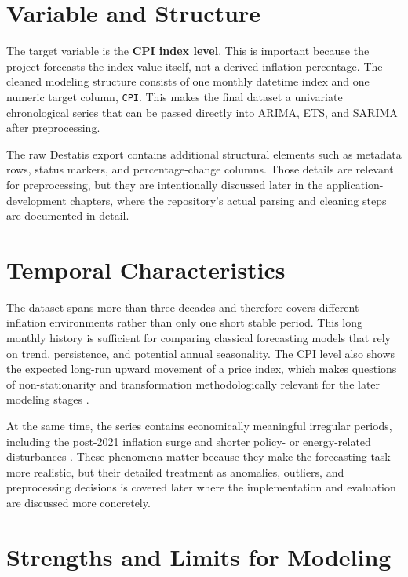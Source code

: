 \section{Variable and Structure}

The target variable is the \textbf{CPI index level}. This is important because the project forecasts the index value itself, not a derived inflation percentage. The cleaned modeling structure consists of one monthly datetime index and one numeric target column, \texttt{CPI}. This makes the final dataset a univariate chronological series that can be passed directly into ARIMA, ETS, and SARIMA after preprocessing.

The raw Destatis export contains additional structural elements such as metadata rows, status markers, and percentage-change columns. Those details are relevant for preprocessing, but they are intentionally discussed later in the application-development chapters, where the repository's actual parsing and cleaning steps are documented in detail.

\section{Temporal Characteristics}

The dataset spans more than three decades and therefore covers different inflation environments rather than only one short stable period. This long monthly history is sufficient for comparing classical forecasting models that rely on trend, persistence, and potential annual seasonality. The CPI level also shows the expected long-run upward movement of a price index, which makes questions of non-stationarity and transformation methodologically relevant for the later modeling stages \cite{Hyndman2021,Box2015}.

At the same time, the series contains economically meaningful irregular periods, including the post-2021 inflation surge and shorter policy- or energy-related disturbances \cite{DestatisCovidCPI2022,DestatisEnergyPriceTrends2023}. These phenomena matter because they make the forecasting task more realistic, but their detailed treatment as anomalies, outliers, and preprocessing decisions is covered later where the implementation and evaluation are discussed more concretely.

\section{Strengths and Limits for Modeling}

